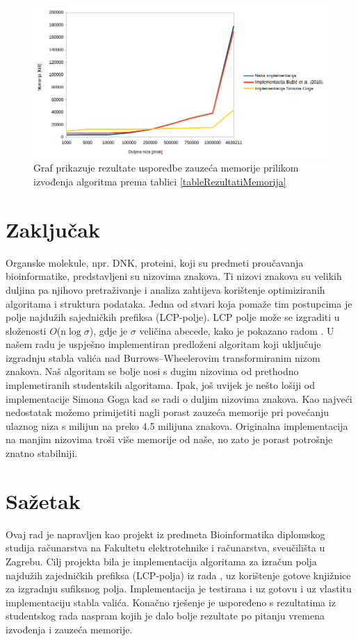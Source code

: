 \documentclass[times, utf8, seminar]{fer}
\begin{document}
\begin{figure}
 \begin{center}
 		\includegraphics[width=\columnwidth]{drugi.png}
 		\caption{Graf prikazuje rezultate usporedbe zauzeća memorije prilikom izvođenja algoritma prema tablici \ref{tableRezultatiMemorija}}
 		\label{fig:graf2}
 \end{center}
\end{figure}


\chapter{Zaključak}

Organske molekule, npr. DNK, proteini, koji su predmeti proučavanja bioinformatike, predstavljeni su nizovima znakova. Ti nizovi znakova su velikih duljina pa njihovo pretraživanje i analiza zahtijeva korištenje optimiziranih algoritama i struktura podataka. Jedna od stvari koja pomaže tim postupcima je polje najdužih sajedničkih prefiksa (LCP-polje). LCP polje može se izgraditi u složenosti $O$(n$\log\sigma$), gdje je $\sigma$ veličina abecede, kako je pokazano radom \cite{beller2013}. U našem radu je uspješno implementiran predloženi algoritam koji uključuje izgradnju stabla valića nad Burrows--Wheelerovim transformiranim nizom znakova. Naš algoritam se bolje nosi s dugim nizovima od prethodno implemetiranih studentskih algoritama. Ipak, još uvijek je nešto lošiji od implementacije Simona Goga kad se radi o duljim nizovima znakova. Kao najveći nedostatak možemo primijetiti nagli porast zauzeća memorije pri povećanju ulaznog niza s milijun na preko 4.5 milijuna znakova. Originalna implementacija na manjim nizovima troši više memorije od naše, no zato je porast potrošnje znatno stabilniji.




\chapter{Sažetak}
Ovaj rad je napravljen kao projekt iz predmeta Bioinformatika diplomskog studija računarstva na Fakultetu elektrotehnike i računarstva, sveučilišta u Zagrebu. Cilj projekta bila je implementacija algoritama za izračun polja najdužih zajedničkih prefiksa (LCP-polja) iz rada \cite{beller2013}, uz korištenje gotove knjižnice za izgradnju sufiksnog polja. Implementacija je testirana i uz gotovu i uz vlastitu implementaciju stabla valića. Konačno rješenje je uspoređeno s rezultatima iz studentskog rada \cite{studenti2016} naspram kojih je dalo bolje rezultate po pitanju vremena izvođenja i zauzeća memorije.
\end{document}
